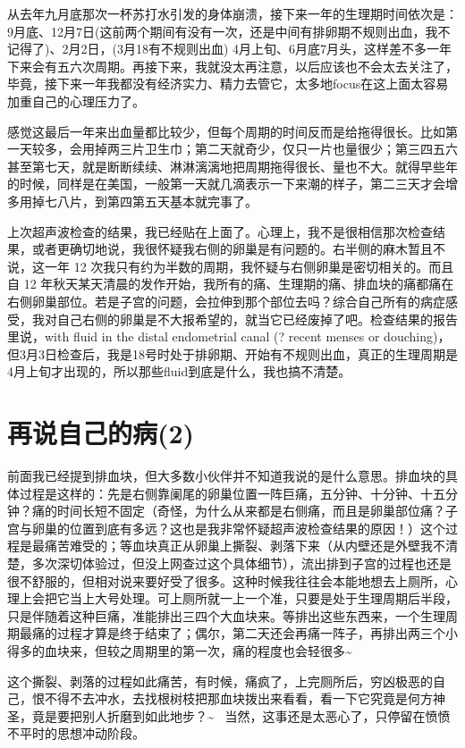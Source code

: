 \documentclass[12pt]{book}
\begin{document}
从去年九月底那次一杯苏打水引发的身体崩溃，接下来一年的生理期时间依次是：9月底、12月7日(这前两个期间有没有一次，还是中间有排卵期不规则出血，我不记得了)、2月2日，(3月18有不规则出血) 4月上旬、6月底7月头，这样差不多一年下来会有五六次周期。再接下来，我就没太再注意，以后应该也不会太去关注了，毕竟，接下来一年我都没有经济实力、精力去管它，太多地focus在这上面太容易加重自己的心理压力了。

感觉这最后一年来出血量都比较少，但每个周期的时间反而是给拖得很长。比如第一天较多，会用掉两三片卫生巾；第二天就奇少，仅只一片也量很少；第三四五六甚至第七天，就是断断续续、淋淋漓漓地把周期拖得很长、量也不大。就得早些年的时候，同样是在美国，一般第一天就几滴表示一下来潮的样子，第二三天才会增多用掉七八片，到第四第五天基本就完事了。

上次超声波检查的结果，我已经贴在上面了。心理上，我不是很相信那次检查结果，或者更确切地说，我很怀疑我右侧的卵巢是有问题的。右半侧的麻木暂且不说，这一年 12 次我只有约为半数的周期，我怀疑与右侧卵巢是密切相关的。而且自 12 年秋天某天清晨的发作开始，我所有的痛、生理期的痛、排血块的痛都痛在右侧卵巢部位。若是子宫的问题，会拉伸到那个部位去吗？综合自己所有的病症感受，我对自己右侧的卵巢是不大报希望的，就当它已经废掉了吧。检查结果的报告里说，with fluid in the distal endometrial canal  (? recent menses or douching)，但3月3日检查后，我是18号时处于排卵期、开始有不规则出血，真正的生理周期是4月上旬才出现的，所以那些fluid到底是什么，我也搞不清楚。

\section{再说自己的病(2)}
\label{sec-43-2}

前面我已经提到排血块，但大多数小伙伴并不知道我说的是什么意思。排血块的具体过程是这样的：先是右侧靠阑尾的卵巢位置一阵巨痛，五分钟、十分钟、十五分钟？痛的时间长短不固定（奇怪，为什么从来都是右侧痛，而且是卵巢部位痛？子宫与卵巢的位置到底有多远？这也是我非常怀疑超声波检查结果的原因！）这个过程是最痛苦难受的；等血块真正从卵巢上撕裂、剥落下来（从内壁还是外壁我不清楚，多次深切体验过，但没上网查过这个具体细节），流出排到子宫的过程也还是很不舒服的，但相对说来要好受了很多。这种时候我往往会本能地想去上厕所，心理上会把它当上大号处理。可上厕所就一上一个准，只要是处于生理周期后半段，只是伴随着这种巨痛，准能排出三四个大血块来。等排出这些东西来，一个生理周期最痛的过程才算是终于结束了；偶尔，第二天还会再痛一阵子，再排出两三个小得多的血块来，但较之周期里的第一次，痛的程度也会轻很多\textasciitilde{}~

这个撕裂、剥落的过程如此痛苦，有时候，痛疯了，上完厕所后，穷凶极恶的自己，恨不得不去冲水，去找根树枝把那血块拨出来看看，看一下它究竟是何方神圣，竟是要把别人折磨到如此地步？\textasciitilde{}~ 当然，这事还是太恶心了，只停留在愤愤不平时的思想冲动阶段。 
\end{document}
